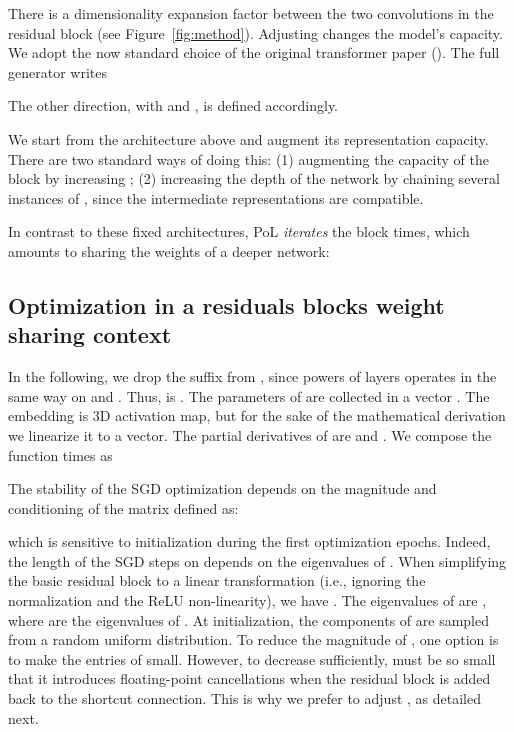 \documentclass[a4paper,10pt]{extarticle}
\makeatletter
\renewcommand{\paragraph}{\@startsection{paragraph}{4}{\z@}{0em}{-0.5em}{\normalfont\normalsize\bfseries}}
\makeatother
\begin{document}
\newcommand{\expfactor}{K}

There is a dimensionality expansion factor  between the two convolutions in the residual block (see Figure~\ref{fig:method}). 
Adjusting  changes the model's capacity. We adopt the now standard choice of the original transformer paper (). 
The full generator writes

The other direction, with  and , is defined accordingly. 


\paragraph{Powers of layers. }

We start from the architecture above and augment its representation capacity. 
There are two standard ways of doing this: (1) augmenting the capacity of the  block by increasing ; (2) increasing the depth of the network by chaining several instances of , since the intermediate representations are compatible. 

In contrast to these fixed architectures, PoL \emph{iterates} the  block  times, which amounts to sharing the weights of a deeper network:



\subsection{Optimization in a residuals blocks weight sharing context}

In the following, we drop the  suffix from , since powers of layers operates in the same way on  and . Thus, 
 is . 
The parameters of  are collected in a vector .
The embedding  is 3D activation map, but for the sake of the mathematical derivation we linearize it to a vector.
The partial derivatives of  are  and .
We compose the  function  times as





The stability of the SGD optimization depends on the magnitude and conditioning of the matrix  defined as:



which is sensitive to initialization during the first optimization epochs.
Indeed, the length of the SGD steps on  depends on the eigenvalues of .
When simplifying the basic residual block to a linear transformation  (i.e., ignoring the normalization and the ReLU non-linearity), we have .
The eigenvalues of  are , where  are the eigenvalues of . 
At initialization, the components of  are sampled from a random uniform distribution. 
To reduce the magnitude of , one option is to make the entries of  small. 
However, to decrease   sufficiently,  must be so small that it introduces floating-point cancellations when the residual block is added back to the shortcut connection. 
This is why we prefer to adjust , as detailed next.
\end{document}

